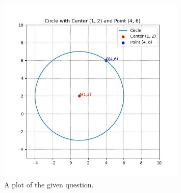 \documentclass[journal]{IEEEtran}
\begin{document}
\begin{figure}[h]
	\centering
	\includegraphics[width=0.8\textwidth]{figs/figure.jpg}
	\caption{A plot of the given question.}
\end{figure}
\end{document}
